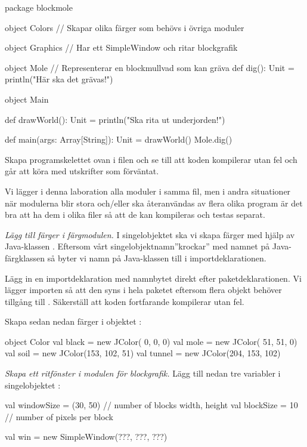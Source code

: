 \begin{Code}
package blockmole

object Colors {
  // Skapar olika färger som behövs i övriga moduler
}

object Graphics {
  // Har ett SimpleWindow och ritar blockgrafik
}

object Mole { // Representerar en blockmullvad som kan gräva
  def dig(): Unit = println("Här ska det grävas!")
}

object Main {
  def drawWorld(): Unit = println("Ska rita ut underjorden!")

  def main(args: Array[String]): Unit = {
    drawWorld()
    Mole.dig()
  }
}
\end{Code}

\noindent Skapa programskelettet ovan i filen  och se till att koden kompilerar utan fel och går att köra med utskrifter som förväntat.

Vi lägger i denna laboration alla moduler i samma fil, men i andra situationer när  modulerna blir stora och/eller ska återanvändas av flera olika program är det bra att ha dem i olika filer så att de kan kompileras och testas separat.


\Task \emph{Lägg till färger i färgmodulen.} I singelobjektet  ska vi skapa färger med hjälp av Java-klassen . Eftersom vårt singelobjektnamn''krockar'' med namnet på Java-färgklassen så byter vi namn på Java-klassen till  i importdeklarationen.

Lägg in en importdeklaration med namnbytet direkt efter paketdeklarationen. Vi lägger importen så att den syns i hela paketet eftersom flera objekt behöver tillgång till . Säkerställ att koden fortfarande kompilerar utan fel.

Skapa sedan nedan färger i objektet :
\begin{Code}
object Color {
  val black  = new JColor(  0,   0,   0)
  val mole   = new JColor( 51,  51,   0)
  val soil   = new JColor(153, 102,  51)
  val tunnel = new JColor(204, 153, 102)
}
\end{Code}


\Task \emph{Skapa ett ritfönster i modulen för blockgrafik.} Lägg till nedan tre variabler i singelobjektet :

\begin{Code}
  val windowSize = (30, 50)  // number of blocks width, height
  val blockSize  = 10        // number of pixels per block

  val win = new SimpleWindow(???, ???, ???)
\end{Code}

